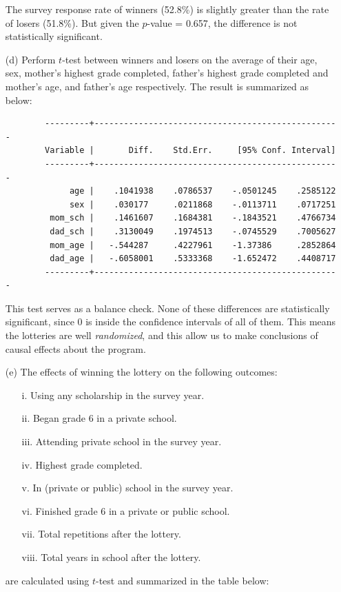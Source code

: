 \documentclass{article}
\begin{document}
\begin{enumerate}
    The survey response rate of winners (52.8\%) is slightly greater than the rate of losers (51.8\%). But given the $p$-value = 0.657, the difference is not statistically significant.\\
    
    
    \item[(d)] Perform $t$-test between winners and losers on the average of their age, sex, mother's highest grade completed, father's highest grade completed and mother's age, and father's age respectively. The result is summarized as below: 

        \begin{verbatim}
        ---------+--------------------------------------------------
        Variable |       Diff.    Std.Err.     [95% Conf. Interval]
        ---------+--------------------------------------------------
             age |    .1041938    .0786537    -.0501245    .2585122
             sex |    .030177     .0211868    -.0113711    .0717251
         mom_sch |    .1461607    .1684381    -.1843521    .4766734
         dad_sch |    .3130049    .1974513    -.0745529    .7005627
         mom_age |   -.544287     .4227961    -1.37386     .2852864
         dad_age |   -.6058001    .5333368    -1.652472    .4408717
        ---------+--------------------------------------------------
        \end{verbatim}
    
    This test serves as a balance check. None of these differences are statistically significant, since 0 is inside the confidence intervals of all of them. This means the lotteries are well \textit{randomized}, and this allow us to make conclusions of causal effects about the program. \\ 
    
    \item[(e)] The effects of winning the lottery on the following outcomes:
        \begin{enumerate}
            \item[i.] Using any scholarship in the survey year.
            \item[ii.] Began grade 6 in a private school.
            \item[iii.] Attending private school in the survey year.
            \item[iv.] Highest grade completed.
            \item[v.] In (private or public) school in the survey year.
            \item[vi.] Finished grade 6 in a private or public school.
            \item[vii.] Total repetitions after the lottery.
            \item[viii.] Total years in school after the lottery.            
        \end{enumerate}
    are calculated using $t$-test and summarized in the table below: 
    

\end{enumerate}
\end{document}
